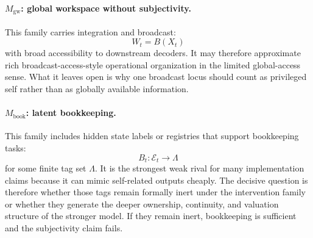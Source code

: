 \documentclass[11pt,a4paper]{article}
\theoremstyle{definition}
\begin{document}
\paragraph{$M_{\mathrm{gw}}$: global workspace without subjectivity.}
This family carries integration and broadcast:
\[
W_t = B(X_t)
\]
with broad accessibility to downstream decoders. It may therefore approximate rich broadcast-access-style operational organization in the limited global-access sense. What it leaves open is why one broadcast locus should count as privileged self rather than as globally available information.

\paragraph{$M_{\mathrm{book}}$: latent bookkeeping.}
This family includes hidden state labels or registries that support bookkeeping tasks:
\[
B_t:\mathcal{E}_t\to \Lambda
\]
for some finite tag set $\Lambda$. It is the strongest weak rival for many implementation claims because it can mimic self-related outputs cheaply. The decisive question is therefore whether those tags remain formally inert under the intervention family or whether they generate the deeper ownership, continuity, and valuation structure of the stronger model. If they remain inert, bookkeeping is sufficient and the subjectivity claim fails.
\end{document}
